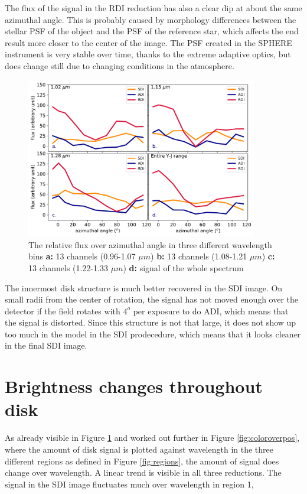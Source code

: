\documentclass[twoside,single,12pt]{lion-msc}
\begin{document}
The flux of the signal in the RDI reduction has also a clear dip at about the same azimuthal angle. This is probably caused by morphology differences between the stellar PSF of the object and the PSF of the reference star, which affects the end result more closer to the center of the image. The PSF created in the SPHERE instrument is very stable over time, thanks to the extreme adaptive optics, but does change still due to changing conditions in the atmosphere.
\bigskip

\begin{figure}[!t]
\centering
\vspace{-0.3cm}
\includegraphics[trim={0cm 0cm 0cm 0cm},clip,width = 0.9\textwidth]{coloroverazimangle}
\caption{The relative flux over azimuthal angle in three different wavelength bins \textbf{a:} 13 channels (0.96-1.07 $\mu m$) \textbf{b:} 13 channels (1.08-1.21 $\mu m$) \textbf{c:} 13 channels (1.22-1.33 $\mu m$) \textbf{d:} signal of the whole spectrum}
\label{fig:coloroverangle}
\vspace{-0.5cm}
\end{figure}

The innermost disk structure is much better recovered in the SDI image. On small radii from the center of rotation, the signal has not moved enough over the detector if the field rotates with $4^o$ per exposure to do ADI, which means that the signal is distorted. Since this structure is not that large, it does not show up too much in the model in the SDI prodecedure, which means that it looks cleaner in the final SDI image.
\bigskip

\section{Brightness changes throughout disk}
As already visible in Figure \ref{fig:coloroverangle} and worked out further in Figure \ref{fig:coloroverpos}, where the amount of disk signal is plotted against wavelength in the three different regions as defined in Figure \ref{fig:regions}, the amount of signal does change over wavelength. A linear trend is visible in all three reductions. The signal in the SDI image fluctuates much over wavelength in region 1, {\par}
\end{document}
